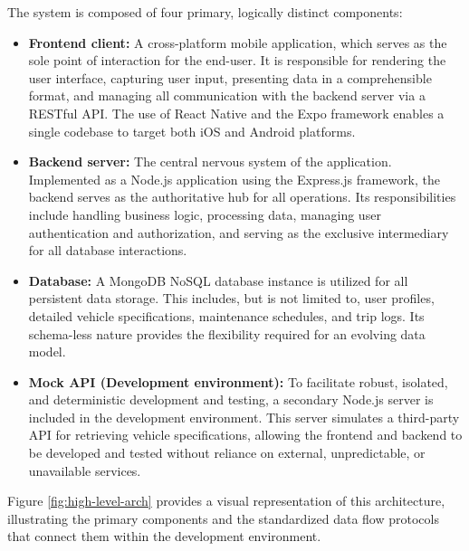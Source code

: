 \textgap

The system is composed of four primary, logically distinct components:
\begin{itemize}
    \item \textbf{Frontend client:} A cross-platform mobile application, which serves as the sole point of interaction for the end-user. It is responsible for rendering the user interface, capturing user input, presenting data in a comprehensible format, and managing all communication with the backend server via a RESTful API. The use of React Native and the Expo framework enables a single codebase to target both iOS and Android platforms.
    
    \textgap

    \item \textbf{Backend server:} The central nervous system of the application. Implemented as a Node.js application using the Express.js framework, the backend serves as the authoritative hub for all operations. Its responsibilities include handling business logic, processing data, managing user authentication and authorization, and serving as the exclusive intermediary for all database interactions.
    
    \textgap

    \item \textbf{Database:} A MongoDB NoSQL database instance is utilized for all persistent data storage. This includes, but is not limited to, user profiles, detailed vehicle specifications, maintenance schedules, and trip logs. Its schema-less nature provides the flexibility required for an evolving data model.
    
    \textgap

    \item \textbf{Mock API (Development environment):} To facilitate robust, isolated, and deterministic development and testing, a secondary Node.js server is included in the development environment. This server simulates a third-party API for retrieving vehicle specifications, allowing the frontend and backend to be developed and tested without reliance on external, unpredictable, or unavailable services.
\end{itemize}

\textgap

Figure \ref{fig:high-level-arch} provides a visual representation of this architecture, illustrating the primary components and the standardized data flow protocols that connect them within the development environment.

